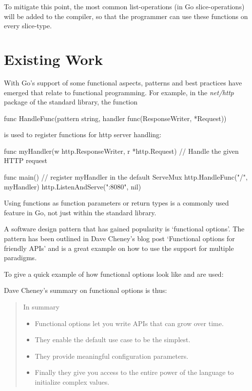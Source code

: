 To mitigate this point, the most common list-operations (in Go slice-operations) will be added to
the compiler, so that the programmer can use these functions on every slice-type.

\section{Existing Work}

With Go's support of some functional aspects, patterns and best practices have emerged that relate
to functional programming.
For example, in the \textit{net/http} package of the standard library, the function
\begin{gocode}
func HandleFunc(pattern string, handler func(ResponseWriter, *Request))
\end{gocode}
is used to register functions for http server handling:

\begin{gocode}
func myHandler(w http.ResponseWriter, r *http.Request) {
    // Handle the given HTTP request
}

func main() {
    // register myHandler in the default ServeMux
    http.HandleFunc("/", myHandler)
    http.ListenAndServe(":8080", nil)
}
\end{gocode}
\autocite{go-http-doc}

Using functions as function parameters or return types is a commonly used feature in Go, not just
within the standard library.

A software design pattern that has gained popularity is `functional options'. The pattern has been
outlined in Dave Cheney's blog post `Functional options for friendly APIs'
and is a great example on how to use the support for multiple paradigms.

To give a quick example of how functional options look like and are used:


Dave Cheney's summary on functional options is thus:
\begin{quote}
    In summary
    \begin{itemize}
        \item Functional options let you write APIs that can grow over time.
        \item They enable the default use case to be the simplest.
        \item They provide meaningful configuration parameters.
        \item Finally they give you access to the entire power of the language to initialize complex values.
    \end{itemize}
\end{quote}\autocite{functional-options}

